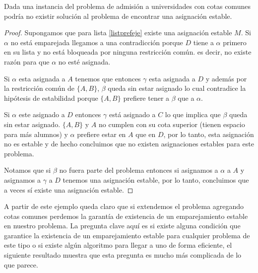 \begin{teo} \cite{Todo}
\label{ejemplo teorema}
Dada una instancia del problema de admisión a universidades con cotas comunes podría no existir solución al problema de encontrar una asignación estable.
\end{teo}
\begin{proof}
Supongamos que para lista \ref{listprefeje} existe una asignación estable $M$. Si $\alpha$ no está emparejada llegamos a una contradicción porque $D$ tiene a $\alpha$ primero en su lista y no está bloqueada por ninguna restricción común. es decir, no existe razón para que $\alpha$ no esté asignada. 

Si $\alpha$ esta asignada a $A$ tenemos que entonces $\gamma$ esta asignada a $D$ y además por la restricción común de $\{A,B\}$, $\beta$ queda sin estar asignado lo cual contradice la hipótesis de estabilidad porque $\{A,B\}$ prefiere tener a $\beta$ que a $\alpha$. 

Si $\alpha$ este asignado a $D$ entonces $\gamma$ está asignado a $C$ lo que implica que $\beta$ queda sin estar asignado. $\{A,B\}$ y $A$ no cumplen con su cota superior (tienen espacio para más alumnos) y $\alpha$ prefiere estar en $A$ que en $D$, por lo tanto, esta asignación no es estable y de hecho concluimos que no existen asignaciones estables para este problema. 

Notamos que si $\beta$ no fuera parte del problema entonces si asignamos a $\alpha$ a $A$ y asignamos a $\gamma$ a $D$ tenemos una asignación estable, por lo tanto, concluimos que a veces sí existe una asignación estable. 
\end{proof}


A partir de este ejemplo queda claro que si extendemos el problema agregando cotas comunes perdemos la garantía de existencia de un emparejamiento estable en nuestro problema. La pregunta clave aquí es si existe alguna condición que garantice la existencia de un emparejamiento estable para cualquier problema de este tipo o si existe algún algoritmo para llegar a uno de forma eficiente, el siguiente resultado muestra que esta pregunta es mucho más complicada de lo que parece. 

